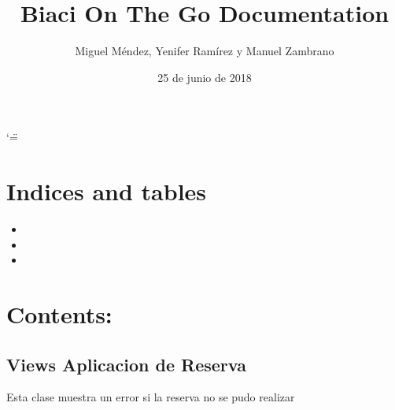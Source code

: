 \documentclass[letterpaper,10pt,spanish]{sphinxmanual}
\title{Biaci On The Go Documentation}
\date{25 de junio de 2018}
\author{Miguel Méndez, Yenifer Ramírez y Manuel Zambrano}
\begin{document}
\ifnum\catcode`\"=\active{}\fi
\maketitle
\sphinxtableofcontents
{}\label{\detokenize{index::doc}}



\chapter{Indices and tables}
\label{\detokenize{index:indices-and-tables}}\begin{itemize}
\item {} 

\item {} 

\item {} 

\end{itemize}


\chapter{Contents:}
\label{\detokenize{index:contents}}

\section{Views Aplicacion de Reserva}
\label{\detokenize{modules/reserva/views:module-reserva.views}}\label{\detokenize{modules/reserva/views:views-aplicacion-de-reserva}}\label{\detokenize{modules/reserva/views::doc}}

\begin{fulllineitems}
\label{\detokenize{modules/reserva/views:reserva.views.ErrorReserva}}
Esta clase muestra un error si la reserva no se pudo realizar

\end{fulllineitems}

\end{document}
